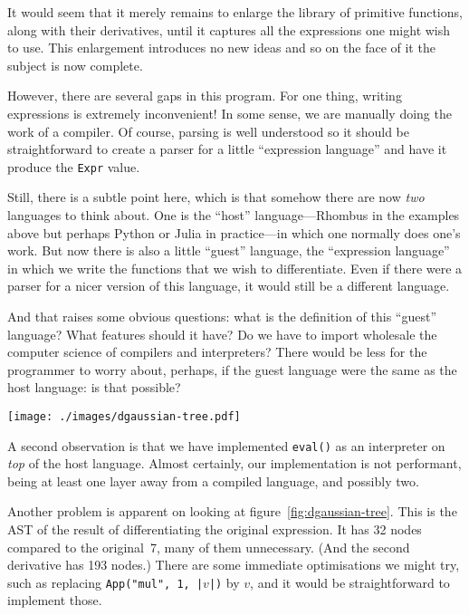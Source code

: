 \documentclass[11pt, a4paper]{article}
\newcommand{\cd}[1]{\texttt{#1}}
\begin{document}
It would seem that it merely remains to enlarge the library of
primitive functions, along with their derivatives, until it captures
all the expressions one might wish to use. This enlargement introduces
no new ideas and so on the face of it the subject is now complete.

However, there are several gaps in this program. For one thing,
writing expressions is extremely inconvenient! In some sense, we are
manually doing the work of a compiler. Of course, parsing is well
understood so it should be straightforward to create a parser for a
little ``expression language'' and have it produce the \cd{Expr}
value.

Still, there is a subtle point here, which is that somehow there are
now \emph{two} languages to think about. One is the ``host''
language---Rhombus in the examples above but perhaps Python or Julia in
practice---in which one normally does one's work. But now there is also
a little ``guest'' language, the ``expression language'' in which we
write the functions that we wish to differentiate. Even if there were
a parser for a nicer version of this language, it would still be a
different language.

And that raises some obvious questions: what is the definition of this
``guest'' language? What features should it have? Do we have to import
wholesale the computer science of compilers and interpreters?  There
would be less for the programmer to worry about, perhaps, if the guest
language were the same as the host language: is that possible?
\begin{figure*}[h]
  \caption{The AST for \cd{dgaussian}.\label{fig:dgaussian-tree}}
  \centering
  \texttt{[image: ./images/dgaussian-tree.pdf]}
\end{figure*}

A second observation is that we have implemented \cd{eval()} as an
interpreter on \emph{top} of the host language. Almost certainly, our
implementation is not performant, being at least one layer away from a
compiled language, and possibly two.

Another problem is apparent on looking at
figure~\ref{fig:dgaussian-tree}. This is the AST of the result of
differentiating the original expression. It has 32 nodes compared to
the original~7, many of them unnecessary. (And the second derivative
has 193 nodes.) There are some immediate optimisations we might try,
such as replacing \cd{App("mul", 1, |$v$|)} by $v$, and it would be
straightforward to implement those.
\end{document}
